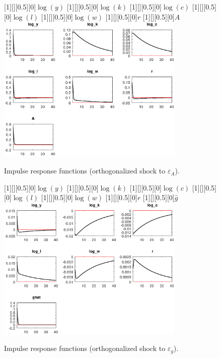  
\begin{figure}[H]
[1][][0.5][0]{${\log(y)}$}
[1][][0.5][0]{${\log(k)}$}
[1][][0.5][0]{${\log(c)}$}
[1][][0.5][0]{${\log(l)}$}
[1][][0.5][0]{${\log(w)}$}
[1][][0.5][0]{${r}$}
[1][][0.5][0]{${A}$}
\centering 
\includegraphics[width=0.80\textwidth]{RBCt_IRF_eps_A}
\caption{Impulse response functions (orthogonalized shock to ${\varepsilon_A}$).}
\label{Fig:IRF:eps_A}
\end{figure}
 
\begin{figure}[H]
[1][][0.5][0]{${\log(y)}$}
[1][][0.5][0]{${\log(k)}$}
[1][][0.5][0]{${\log(c)}$}
[1][][0.5][0]{${\log(l)}$}
[1][][0.5][0]{${\log(w)}$}
[1][][0.5][0]{${r}$}
[1][][0.5][0]{${\hat g}$}
\centering 
\includegraphics[width=0.80\textwidth]{RBCt_IRF_eps_g}
\caption{Impulse response functions (orthogonalized shock to ${\varepsilon_g}$).}
\label{Fig:IRF:eps_g}
\end{figure}
 
 
